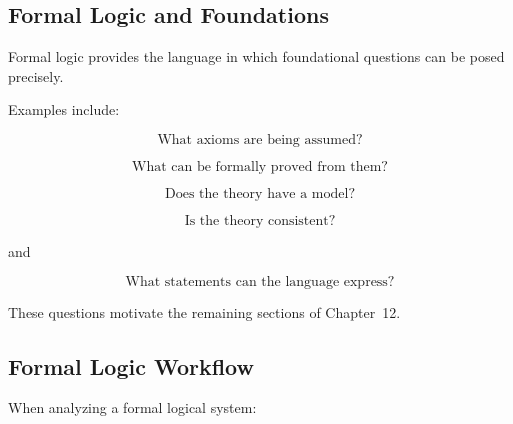 \subsection{Formal Logic and Foundations}
\label{subsec:formal-logic-foundations}

Formal logic provides the language in which foundational questions can be
posed precisely.

Examples include:

\[
\boxed{
\text{What axioms are being assumed?}
}
\]

\[
\boxed{
\text{What can be formally proved from them?}
}
\]

\[
\boxed{
\text{Does the theory have a model?}
}
\]

\[
\boxed{
\text{Is the theory consistent?}
}
\]

and

\[
\boxed{
\text{What statements can the language express?}
}
\]

These questions motivate the remaining sections of Chapter~12.

\subsection{Formal Logic Workflow}
\label{subsec:formal-logic-workflow}

When analyzing a formal logical system:

